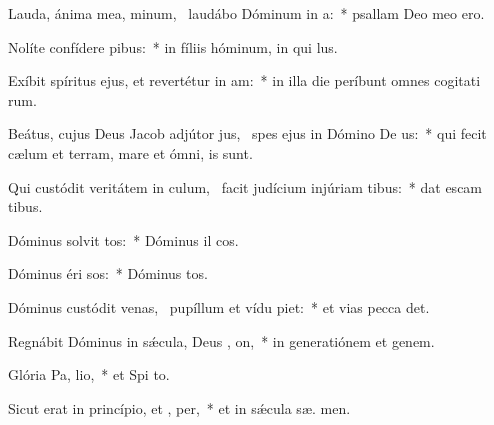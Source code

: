 \item Lauda, ánima mea, minum,~\pscross{} laudábo Dóminum in  a:~* psallam Deo meo  ero.
\item Nolíte confídere  pibus:~* in fíliis hóminum, in qui   lus.
\item Exíbit spíritus ejus, et revertétur in  am:~* in illa die períbunt omnes cogitati rum.
\item Beátus, cujus Deus Jacob adjútor jus,~\pscross{} spes ejus in Dómino De us:~* qui fecit cælum et terram, mare et ómni,   is sunt.
\item Qui custódit veritátem in culum,~\pscross{} facit judícium injúriam tibus:~* dat escam tibus.
\item Dóminus solvit tos:~* Dóminus il cos.
\item Dóminus éri sos:~* Dóminus  tos.
\item Dóminus custódit venas,~\pscross{} pupíllum et vídu piet:~* et vias pecca det.
\item Regnábit Dóminus in sǽcula, Deus , on,~* in generatiónem et genem.
\item Glória Pa,  lio,~* et Spi to.
\item Sicut erat in princípio, et ,  per,~* et in sǽcula sæ. men.
